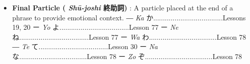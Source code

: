 \begin{itemize}
\item \textbf{Final Particle ( \emph{Shū-joshi }終助詞) }: A particle placed at the end of a phrase to provide emotional context. \hfill\break
\hfill\break
― \emph{Ka }か\dothyp{}\dothyp{}\dothyp{}\dothyp{}\dothyp{}\dothyp{}\dothyp{}\dothyp{}\dothyp{}\dothyp{}\dothyp{}\dothyp{}\dothyp{}\dothyp{}\dothyp{}\dothyp{}\dothyp{}\dothyp{}\dothyp{}\dothyp{}\dothyp{}\dothyp{}\dothyp{}\dothyp{}\dothyp{}\dothyp{}\dothyp{}\dothyp{}\dothyp{}\dothyp{}\dothyp{}\dothyp{}\dothyp{}\dothyp{}\dothyp{}\dothyp{}Lessons 19, 20 \hfill\break
ー \emph{Yo }よ\dothyp{}\dothyp{}\dothyp{}\dothyp{}\dothyp{}\dothyp{}\dothyp{}\dothyp{}\dothyp{}\dothyp{}\dothyp{}\dothyp{}\dothyp{}\dothyp{}\dothyp{}\dothyp{}\dothyp{}\dothyp{}\dothyp{}\dothyp{}\dothyp{}\dothyp{}\dothyp{}\dothyp{}\dothyp{}\dothyp{}\dothyp{}\dothyp{}\dothyp{}\dothyp{}\dothyp{}\dothyp{}\dothyp{}\dothyp{}\dothyp{}\dothyp{}Lesson 77 \hfill\break
ー \emph{Ne }ね\dothyp{}\dothyp{}\dothyp{}\dothyp{}\dothyp{}\dothyp{}\dothyp{}\dothyp{}\dothyp{}\dothyp{}\dothyp{}\dothyp{}\dothyp{}\dothyp{}\dothyp{}\dothyp{}\dothyp{}\dothyp{}\dothyp{}\dothyp{}\dothyp{}\dothyp{}\dothyp{}\dothyp{}\dothyp{}\dothyp{}\dothyp{}\dothyp{}\dothyp{}\dothyp{}\dothyp{}\dothyp{}\dothyp{}\dothyp{}\dothyp{}\dothyp{}Lesson 77 \hfill\break
ー \emph{Wa }わ\dothyp{}\dothyp{}\dothyp{}\dothyp{}\dothyp{}\dothyp{}\dothyp{}\dothyp{}\dothyp{}\dothyp{}\dothyp{}\dothyp{}\dothyp{}\dothyp{}\dothyp{}\dothyp{}\dothyp{}\dothyp{}\dothyp{}\dothyp{}\dothyp{}\dothyp{}\dothyp{}\dothyp{}\dothyp{}\dothyp{}\dothyp{}\dothyp{}\dothyp{}\dothyp{}\dothyp{}\dothyp{}\dothyp{}..Lesson 78 \hfill\break
― \emph{Te }て\dothyp{}\dothyp{}\dothyp{}\dothyp{}\dothyp{}\dothyp{}\dothyp{}\dothyp{}\dothyp{}\dothyp{}\dothyp{}\dothyp{}\dothyp{}\dothyp{}\dothyp{}\dothyp{}\dothyp{}\dothyp{}\dothyp{}\dothyp{}\dothyp{}\dothyp{}\dothyp{}\dothyp{}\dothyp{}\dothyp{}\dothyp{}\dothyp{}\dothyp{}\dothyp{}\dothyp{}\dothyp{}\dothyp{}\dothyp{}\dothyp{}\dothyp{}Lesson 30 \hfill\break
ー \emph{Na }な\dothyp{}\dothyp{}\dothyp{}\dothyp{}\dothyp{}\dothyp{}\dothyp{}\dothyp{}\dothyp{}\dothyp{}\dothyp{}\dothyp{}\dothyp{}\dothyp{}\dothyp{}\dothyp{}\dothyp{}\dothyp{}\dothyp{}\dothyp{}\dothyp{}\dothyp{}\dothyp{}\dothyp{}\dothyp{}\dothyp{}\dothyp{}\dothyp{}\dothyp{}\dothyp{}\dothyp{}\dothyp{}\dothyp{}..Lesson 78 \hfill\break
ー \emph{Zo }ぞ\dothyp{}\dothyp{}\dothyp{}\dothyp{}\dothyp{}\dothyp{}\dothyp{}\dothyp{}\dothyp{}\dothyp{}\dothyp{}\dothyp{}\dothyp{}\dothyp{}\dothyp{}\dothyp{}\dothyp{}\dothyp{}\dothyp{}\dothyp{}\dothyp{}\dothyp{}\dothyp{}\dothyp{}\dothyp{}\dothyp{}\dothyp{}\dothyp{}\dothyp{}\dothyp{}\dothyp{}\dothyp{}\dothyp{}..Lesson 78 \hfill\break

\end{itemize}
